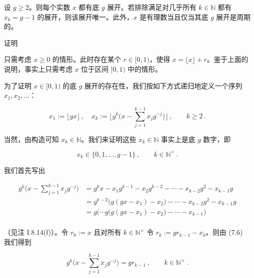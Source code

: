 \begin{theorem}

设 $ g \geq 2 $。则每个实数 $ x $ 都有底 $ g $ 展开。若排除满足对几乎所有 $ k \in \mathbb{N} $ 都有 $ x_k = g - 1 $ 的展开，则该展开唯一。此外，$ x $ 是有理数当且仅当其底 $ g $ 展开是周期的。

证明

\begin{items}
\item

只需考虑 $ x \geq 0 $ 的情形。此时存在某个 $ r \in [0,1) $，使得 $ x = \lfloor x \rfloor + r $。鉴于上面的说明，事实上只需考虑 $x$ 位于区间 $ [0,1) $ 中的情形。

\item

为了证明 $x \in [0,1)$ 的底 $g$ 展开的存在性，我们按如下方式递归地定义一个序列 $x_1, x_2, \ldots$：

\begin{equation}
x_{1}:=\lfloor g x\rfloor~,\quad x_{k}:=\Big\lfloor g^{k}\Big(x-\sum_{j=1}^{k-1}x_{j} g^{-j}\Big)\Big\rfloor~,\qquad k\geq2~.
\end{equation}

当然，由构造可知 $ x_k \in \mathbb{N} $。我们来证明这些 $ x_k \in \mathbb{N} $ 事实上是底 $ g $ 数字，即

\begin{equation}
x_{k}\in\{0,1,\ldots,g-1\}~,\qquad k\in\mathbb{N}^{\times}~.
\end{equation}

我们首先写出

\begin{equation}
\begin{aligned}
g^{k}\Big(x-\sum_{j=1}^{k-1}x_{j} g^{-j}\Big)&=g^{k} x-x_{1}g^{k-1}-x_{2}g^{k-2}-\cdots-x_{k-2}g^{2}-x_{k-1}g\\&=g^{k-2}\big(g(gx-x_{1})-x_{2}\big)-\cdots-x_{k-2}g^{2}-x_{k-1}g\\&=g\Big(\cdots g\big(g(gx-x_{1})-x_{2}\big)-\cdots-x_{k-1}\Big)\\
\end{aligned}
\end{equation}

（见注 I.8.14(f)）。令 $ r_0 := x $ 且对所有 $ k \in \mathbb{N}^\times $ 令 $ r_k := gr_{k-1} - x_k $。则由 (7.6) 我们得到

\begin{equation}
g^{k}\Big(x-\sum_{j=1}^{k-1}x_{j}g^{-j}\Big)=g r_{k-1}~,\qquad k\in\mathbb{N}^{\times}~.
\end{equation}


\end{items}
\end{theorem}
